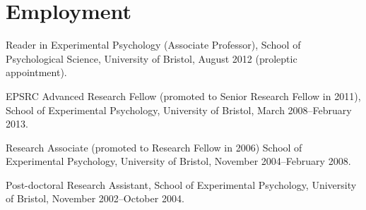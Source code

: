 \documentclass[a4paper, 10pt]{article}
\renewenvironment{itemize}{
  \begin{list}{}{
    \setlength{\leftmargin}{1.5em}
  }
}{
  \end{list}
}
\begin{document}
\section*{Employment}
\begin{itemize}
\item Reader in Experimental Psychology (Associate Professor), School of Psychological Science, University of Bristol, August 2012 (proleptic appointment).
\item EPSRC Advanced Research Fellow (promoted to Senior Research Fellow in 2011), School of Experimental Psychology, University of Bristol, March 2008--February 2013.
\item Research Associate (promoted to Research Fellow in 2006) School of Experimental Psychology, University of Bristol, November 2004--February 2008.
\item Post-doctoral Research Assistant, School of Experimental Psychology, University of Bristol,
  November 2002--October 2004.
\end{itemize}

\end{document}
